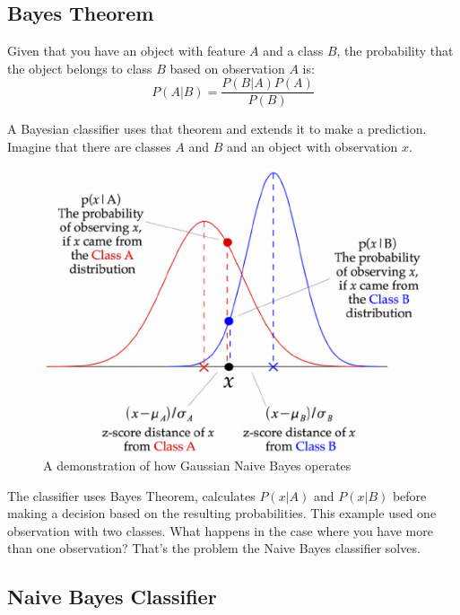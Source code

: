 \documentclass[11pt, twoside, reqno]{book}
\begin{document}
\subsection{Bayes Theorem}

\begin{theorem}
Given that you have an object with feature $A$ and a class $B$, the probability that the object belongs to class $B$ based on observation $A$ is:
\begin{equation}
\label{eq:bayes}
P(A|B) = \dfrac{P(B|A)P(A)}{P(B)}
\end{equation}
\end{theorem}

A Bayesian classifier uses that theorem and extends it to make a prediction. Imagine that there are classes $A$ and $B$ and an object with observation $x$. 
\begin{figure}[H]
\centering
	\includegraphics[scale=0.5]{bayes}
	\caption{A demonstration of how Gaussian Naive Bayes operates \cite{researchgate_2013}}\label{fig:bayes}
\end{figure}
The classifier uses Bayes Theorem, calculates $P(x|A)$ and $P(x|B)$ before making a decision based on the resulting probabilities. This example used one observation with two classes. What happens in the case where you have more than one observation? That's the problem the Naive Bayes classifier solves. 

\subsection{Naive Bayes Classifier}
\end{document}
